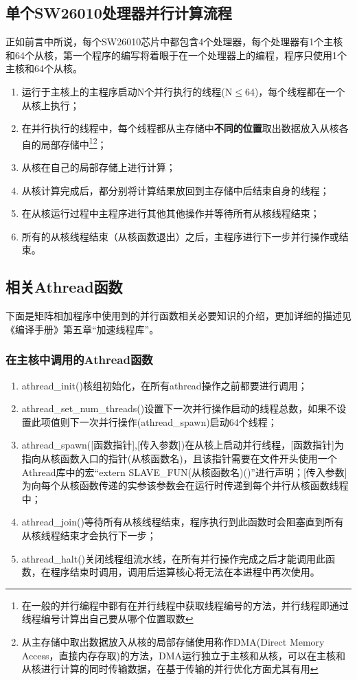 \subsection{单个SW26010处理器并行计算流程}\label{section:并行计算的基本流程}
正如前言中所说，每个SW26010芯片中都包含4个处理器，每个处理器有1个主核和64个从核，第一个程序的编写将着眼于在一个处理器上的编程，程序只使用1个主核和64个从核。

\begin{enumerate}
	\item 运行于主核上的主程序启动N个并行执行的线程(N$\leq$64)，每个线程都在一个从核上执行；
	\item 在并行执行的线程中，每个线程都从主存储中\textbf{不同的位置}取出数据放入从核各自的局部存储中\footnote{在一般的并行编程中都有在并行线程中获取线程编号的方法，并行线程即通过线程编号计算出自己要从哪个位置取数\label{footnote:取数据说明}}\footnote{从主存储中取出数据放入从核的局部存储使用称作DMA(Direct Memory Access，直接内存存取)的方法，DMA运行独立于主核和从核，可以在主核和从核进行计算的同时传输数据，在基于传输的并行优化方面尤其有用\label{footnote:DMA}}；
	\item 从核在自己的局部存储上进行计算；
	\item 从核计算完成后，都分别将计算结果放回到主存储中后结束自身的线程；
	\item 在从核运行过程中主程序进行其他其他操作并等待所有从核线程结束；
	\item 所有的从核线程结束（从核函数退出）之后，主程序进行下一步并行操作或结束。
\end{enumerate}

\subsection{相关Athread函数}
下面是矩阵相加程序中使用到的并行函数相关必要知识的介绍，更加详细的描述见《编译手册》第五章“加速线程库”。
\subsubsection{在主核中调用的Athread函数}
\begin{enumerate}
	\item athread\_init()核组初始化，在所有athread操作之前都要进行调用；
	\item athread\_set\_num\_threads()设置下一次并行操作启动的线程总数，如果不设置此项值则下一次并行操作(athread\_spawn)启动64个线程；
	\item athread\_spawn([函数指针],[传入参数])在从核上启动并行线程，[函数指针]为指向从核函数入口的指针(从核函数名)，且该指针需要在文件开头使用一个Athread库中的宏“extern SLAVE\_FUN(从核函数名)()”进行声明；[传入参数]为向每个从核函数传递的实参该参数会在运行时传递到每个并行从核函数线程中；
	\item athread\_join()等待所有从核线程结束，程序执行到此函数时会阻塞直到所有从核线程结束才会执行下一步；
	\item athread\_halt()关闭线程组流水线，在所有并行操作完成之后才能调用此函数，在程序结束时调用，调用后运算核心将无法在本进程中再次使用。
\end{enumerate}

